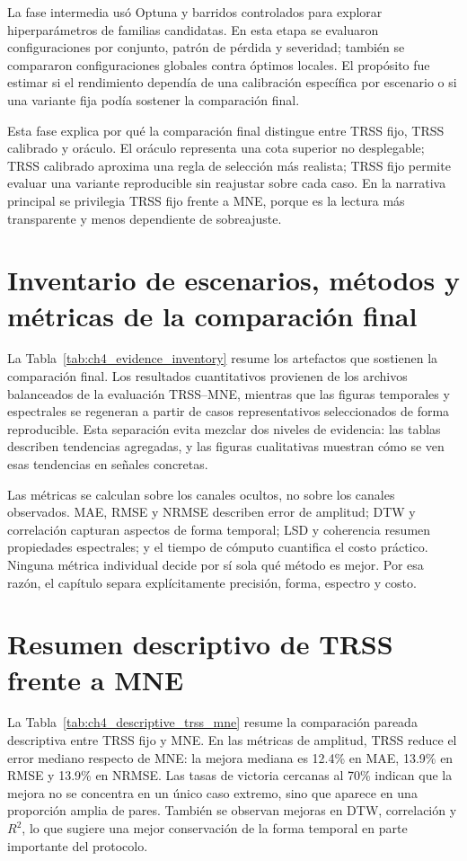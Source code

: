 La fase intermedia usó Optuna y barridos controlados para explorar hiperparámetros de familias candidatas. En esta etapa se evaluaron configuraciones por conjunto, patrón de pérdida y severidad; también se compararon configuraciones globales contra óptimos locales. El propósito fue estimar si el rendimiento dependía de una calibración específica por escenario o si una variante fija podía sostener la comparación final.

Esta fase explica por qué la comparación final distingue entre TRSS fijo, TRSS calibrado y oráculo. El oráculo representa una cota superior no desplegable; TRSS calibrado aproxima una regla de selección más realista; TRSS fijo permite evaluar una variante reproducible sin reajustar sobre cada caso. En la narrativa principal se privilegia TRSS fijo frente a MNE, porque es la lectura más transparente y menos dependiente de sobreajuste.

\section{Inventario de escenarios, métodos y métricas de la comparación final}

La Tabla~\ref{tab:ch4_evidence_inventory} resume los artefactos que sostienen la comparación final. Los resultados cuantitativos provienen de los archivos balanceados de la evaluación TRSS--MNE, mientras que las figuras temporales y espectrales se regeneran a partir de casos representativos seleccionados de forma reproducible. Esta separación evita mezclar dos niveles de evidencia: las tablas describen tendencias agregadas, y las figuras cualitativas muestran cómo se ven esas tendencias en señales concretas.



Las métricas se calculan sobre los canales ocultos, no sobre los canales observados. MAE, RMSE y NRMSE describen error de amplitud; DTW y correlación capturan aspectos de forma temporal; LSD y coherencia resumen propiedades espectrales; y el tiempo de cómputo cuantifica el costo práctico. Ninguna métrica individual decide por sí sola qué método es mejor. Por esa razón, el capítulo separa explícitamente precisión, forma, espectro y costo.

\section{Resumen descriptivo de TRSS frente a MNE}

La Tabla~\ref{tab:ch4_descriptive_trss_mne} resume la comparación pareada descriptiva entre TRSS fijo y MNE. En las métricas de amplitud, TRSS reduce el error mediano respecto de MNE: la mejora mediana es 12.4\% en MAE, 13.9\% en RMSE y 13.9\% en NRMSE. Las tasas de victoria cercanas al 70\% indican que la mejora no se concentra en un único caso extremo, sino que aparece en una proporción amplia de pares. También se observan mejoras en DTW, correlación y $R^2$, lo que sugiere una mejor conservación de la forma temporal en parte importante del protocolo.

